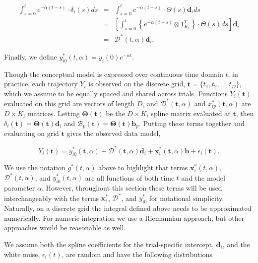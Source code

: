 \documentclass[preprint]{JASA}
\begin{document}
\begin{eqnarray*}
 \int_{s=0}^t e^{-\alpha (t-s)} \cdot \delta_i(s)ds &=&   \int_{s = 0}^t e^{-\alpha (t-s)} \cdot \Theta(s)\mathbf{d}_i ds\\[5mm]
&=&  \left[\int_{s = 0}^t \left\{ e^{-\alpha (t-s)}\otimes 1^T_{K_t} \right \}\cdot \Theta(s) ds\right] \mathbf{d}_i  \\[5mm]
&=& \mathcal{D}^*(t, \alpha)\mathbf{d}_i,
\end{eqnarray*}

\noindent Finally, we define
\(y_{i0}^*(t, \alpha) = y_i(0)e^{-\alpha t}\).

Though the conceptual model is expressed over continuous time domain
\(t\), in practice, each trajectory \(Y_i\) is observed on the discrete
grid, \(\mathbf{t} = \{t_1, t_2, \ldots, t_D\}\), which we assume to be
equally spaced and shared across trials. Functions \(Y_i(\mathbf{t})\)
evaluated on this grid are vectors of length \(D\), and
\(\mathcal{D}^*(\mathbf{t}, \alpha)\) and
\(x_{ip}^*(\mathbf{t}, \alpha)\) are \(D \times K_t\) matrices. Letting
\(\mathbf{\Theta}(\mathbf{t})\) be the \(D \times K_t\) spline matrix
evaluated at \(\mathbf{t}\), then
\(\delta_i(\mathbf{t}) = \mathbf{\Theta}(\mathbf{t})\mathbf{d}_i\) and
\(\mathcal{B}_p(\mathbf{t}) = \mathbf{\Theta}(\mathbf{t})\mathbf{b}_p\).
Putting these terms together and evaluating on grid \(\mathbf{t}\) gives
the observed data model,

\begin{equation}
\label{eq:observed_mod} 
    Y_i(\mathbf{t}) = y_{i0}^*(\mathbf{t}, \alpha) +  \mathcal{D}^*(\mathbf{t}, \alpha)\mathbf{d}_i +  \mathbf{x}_i^*(\mathbf{t}, \alpha)\mathbf{b} + \epsilon_i(\mathbf{t}).
\end{equation}

\noindent We use the notation \(g^*(t, \alpha)\) above to highlight that
terms \(\mathbf{x}_i^*(t, \alpha)\), \(\mathcal{D}^*(t, \alpha)\), and
\(y_{i0}^*(t, \alpha)\) are all functions of both time \(t\) and the
model parameter \(\alpha\). However, throughout this section these terms
will be used interchangeably with the terms \(\mathbf{x}_i^*\),
\(\mathcal{D}^*\), and \(y_{i0}^*\) for notational simplicity.
Naturally, on a discrete grid the integral defined above needs to be
approximated numerically. For numeric integration we use a Riemannian
approach, but other approaches would be reasonable as well.

We assume both the spline coefficients for the trial-specific intercept,
\(\mathbf{d}_i\), and the white noise, \(\epsilon_i(t)\), are random and
have the following distributions
\end{document}
